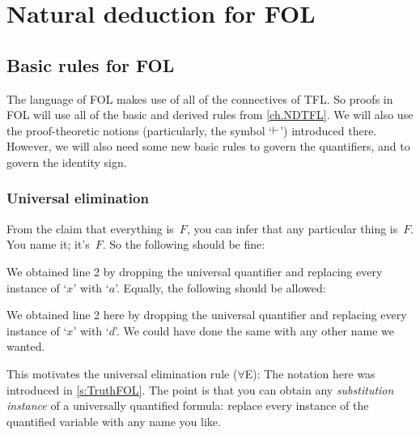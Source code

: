 \part{Natural deduction for FOL}
\label{ch.NDFOL}

\chapter{Basic rules for FOL}\label{s:BasicFOL}

The language of FOL makes use of all of the connectives of TFL. So proofs in FOL will use all of the basic and derived rules from \cref{ch.NDTFL}. We will also use the proof-theoretic notions (particularly, the symbol `$\vdash$') introduced there. However, we will also need some new basic rules to govern the quantifiers, and to govern the identity sign.


\section{Universal elimination}

From the claim that everything is~$F$, you can infer that any particular thing is~$F$. You name it; it's~$F$. So the following should be fine:
\begin{fitchproof}
	\PR
	 
\end{fitchproof}
We obtained line 2 by dropping the universal quantifier and replacing every instance of `$x$' with `$a$'. Equally, the following should be allowed:
\begin{fitchproof}
	\PR
	 
\end{fitchproof}
We obtained line 2 here by dropping the universal quantifier and replacing every instance of `$x$' with `$d$'. We could have done the same with any other name we wanted.

This motivates the universal elimination rule ($\forall$E):
The notation here was introduced in \cref{s:TruthFOL}. The point is that you can obtain any \emph{substitution instance} of a universally quantified formula: replace every instance of the quantified variable with any name you like.

